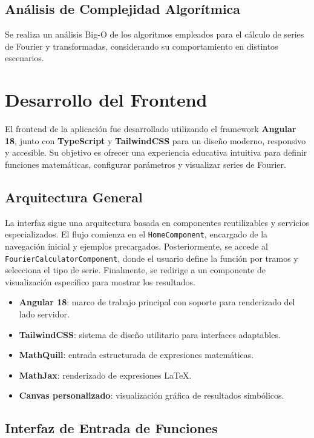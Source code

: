 \subsection{Análisis de Complejidad Algorítmica}
Se realiza un análisis Big-O de los algoritmos empleados para el cálculo de series de Fourier y transformadas, considerando su comportamiento en distintos escenarios.

\section{Desarrollo del Frontend}
\label{sec:frontend-desarrollo}

El frontend de la aplicación fue desarrollado utilizando el framework \textbf{Angular 18}, junto con \textbf{TypeScript} y \textbf{TailwindCSS} para un diseño moderno, responsivo y accesible. Su objetivo es ofrecer una experiencia educativa intuitiva para definir funciones matemáticas, configurar parámetros y visualizar series de Fourier.

\subsection{Arquitectura General}

La interfaz sigue una arquitectura basada en componentes reutilizables y servicios especializados. El flujo comienza en el \texttt{HomeComponent}, encargado de la navegación inicial y ejemplos precargados. Posteriormente, se accede al \texttt{FourierCalculatorComponent}, donde el usuario define la función por tramos y selecciona el tipo de serie. Finalmente, se redirige a un componente de visualización específico para mostrar los resultados.

\begin{itemize}
	\item \textbf{Angular 18}: marco de trabajo principal con soporte para renderizado del lado servidor.
	\item \textbf{TailwindCSS}: sistema de diseño utilitario para interfaces adaptables.
	\item \textbf{MathQuill}: entrada estructurada de expresiones matemáticas.
	\item \textbf{MathJax}: renderizado de expresiones LaTeX.
	\item \textbf{Canvas personalizado}: visualización gráfica de resultados simbólicos.
\end{itemize}

\subsection{Interfaz de Entrada de Funciones}

